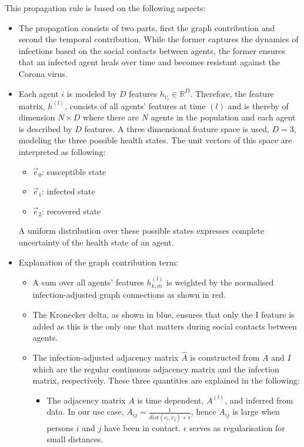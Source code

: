 \documentclass[]{article}
\begin{document}
This propagation rule is based on the following aspects:

\begin{itemize}
	\item The propagation consists of two parts, first the graph contribution and second the temporal contribution. While the former captures the dynamics of infections based on the social contacts between agents, the former ensures that an infected agent heals over time and becomes resistant against the Corona virus.
	\item Each agent $i$ is modeled by $D$ features $h_{v_i}\in\mathbb{R}^D$. Therefore, the feature matrix, $h^{(l)}$, consists of all agents' features at time $(l)$ and is thereby of dimension $N\times D$ where there are $N$ agents in the population and each agent is described by $D$ features. A three dimensional feature space is used, $D=3$, modeling the three possible health states. The unit vectors of this space are interpreted as following:
	\begin{itemize}
		\item $\vec{e}_0$: susceptible state
		\item $\vec{e}_1$: infected state
		\item $\vec{e}_2$: recovered state
	\end{itemize}
	A uniform distribution over these possible states expresses complete uncertainty of the health state of an agent.
	\item Explanation of the graph contribution term:
	\begin{itemize}
		\item A sum over all agents' features $h_{k,m}^{(l)}$ is weighted by the normalised infection-adjusted graph connections as shown in red.
		\item The Kronecker delta, as shown in blue, ensures that only the I feature is added as this is the only one that matters during social contacts between agents.
		\item The infection-adjusted adjacency matrix $\hat{A}$ is constructed from $A$ and $I$ which are the regular continuous adjacency matrix and the infection matrix, respectively. These three quantities are explained in the following:
		\begin{itemize}
			\item The adjacency matrix $A$ is time dependent, $A^{(l)}$, and inferred from data. In our use case, $A_{ij} = \frac{1}{dist(v_i, v_j)+\epsilon}$, hence $A_{ij}$ is large when persons $i$ and $j$ have been in contact. $\epsilon$ serves as regularisation for small distances.

\end{itemize}
\end{itemize}
\end{itemize}
\end{document}
